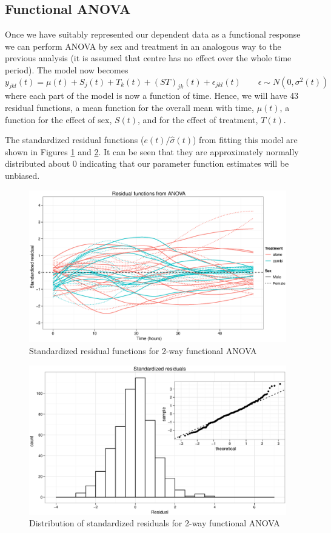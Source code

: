 \subsection{Functional ANOVA}
Once we have suitably represented our dependent data as a functional response we can perform ANOVA by sex and treatment in an analogous way to the previous analysis (it is assumed that centre has no effect over the whole time period). The model now becomes
\begin{equation}
y_{jkl}(t)=\mu(t)+S_{j}(t)+T_{k}(t)+(ST)_{jk}(t)+\epsilon_{jkl}(t)\quad\quad\epsilon\sim N(0, \sigma^{2}(t))\label{aovfda}
\end{equation}
where each part of the model is now a function of time. Hence, we will have 43 residual functions, a mean function for the overall mean with time, $\mu(t)$, a function for the effect of sex, $S(t)$, and for the effect of treatment, $T(t)$.

The standardized residual functions ($e(t)/\hat{\sigma}(t)$) from fitting this model are shown in Figures \ref{fdaresids} and \ref{fdahistqq}. It can be seen that they are approximately normally distributed about 0 indicating that our parameter function estimates will be unbiased.
\begin{figure}[p]
\includegraphics[width=150mm]{fdaresids.eps} 
\caption{Standardized residual functions for 2-way functional ANOVA}
\label{fdaresids}
\end{figure}
\begin{figure}[p]
\includegraphics[width=150mm]{fdahistqq.eps} 
\caption{Distribution of standardized residuals for 2-way functional ANOVA}
\label{fdahistqq}
\end{figure}

